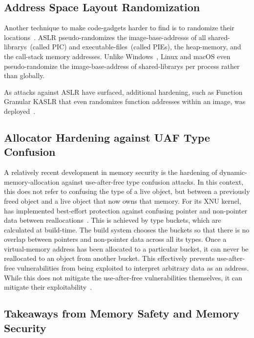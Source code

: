 \subsection{Address Space Layout Randomization}
\label{sec:aslr}

Another technique to make \glspl{code-gadget} harder to find is to randomize their locations~\cite{10.1007/978-3-642-33338-5_5,ms-aslr}. \Gls{ASLR} pseudo-randomizes the \glspl{image-base-address} of all \glspl{shared-library}~(called \gls{PIC}) and \glspl{executable-file}~(called \glspl{PIE}), the \gls{heap-memory}, and the \gls{call-stack} memory addresses. Unlike Windows~\cite{ms-dll-base-addr}, Linux and macOS even pseudo-randomize the \gls{image-base-address} of \glspl{shared-library} per process rather than globally.

As attacks against \gls{ASLR} have surfaced, additional hardening, such as Function Granular \gls{KASLR} that even randomizes function addresses within an \gls{image}, was deployed~\cite{fgkaslr}.

\subsection{Allocator Hardening against UAF Type Confusion}

A relatively recent development in memory security is the hardening of \gls{dynamic-memory-allocation} against \gls{use-after-free} type confusion attacks. In this context, this does not refer to confusing the type of a live object, but between a previously freed object and a live object that now owns that memory. For its XNU kernel,  has implemented best-effort protection against confusing pointer and non-pointer data between reallocations~\cite{apple-mem-alloc}. This is achieved by type buckets, which are calculated at build-time. The build system chooses the buckets so that there is no overlap between pointers and non-pointer data across all its types. Once a \gls{virtual-memory} address has been allocated to a particular bucket, it can never be reallocated to an object from another bucket. This effectively prevents \gls{use-after-free} vulnerabilities from being exploited to interpret arbitrary data as an address. While this does not mitigate the \gls{use-after-free} vulnerabilities themselves, it can mitigate their exploitability~\cite{apple-mem-alloc-ex}.

\subsection{Takeaways from Memory Safety and Memory Security}


